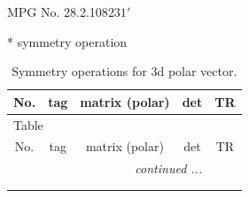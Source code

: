 \documentclass[fleqn,8pt]{jsarticle}
\begin{document}
\setcounter{MaxMatrixCols}{32}

\renewcommand{\tablename}{Table~}
\renewcommand{\figurename}{Figure~}
\begin{center}
\LARGE
MPG No. 28.2.108\quad$231'$
\end{center}
* symmetry operation
\renewcommand{\arraystretch}{1.3}
\begin{longtable}{ccccc}
\caption{Symmetry operations for 3d polar vector.}
 \\
 \hline \hline
No. & tag & matrix (polar) & det & TR \\ \hline \endfirsthead

\multicolumn{4}{l}{\tablename\ \thetable{}} \\
 \hline \hline
No. & tag & matrix (polar) & det & TR \\ \hline \endhead

 \hline \hline
\multicolumn{4}{r}{\footnotesize\it continued ...} \\ \endfoot

 \hline \hline
\multicolumn{4}{r}{} \\ \endlastfoot


\end{longtable}
\end{document}
